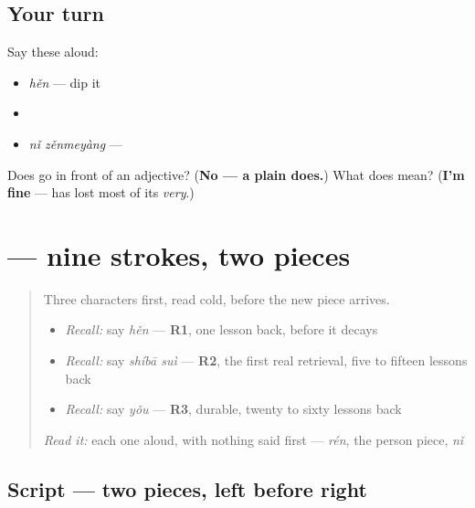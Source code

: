 \subsection*{Your turn}
Say these aloud:

\begin{itemize}
\raggedright
  \item \emph{hěn} — dip it
  \item {}
  \item \emph{nǐ zěnmeyàng} — 
\end{itemize}

\begin{tcolorbox}[breakable,colback=teal!4,colframe=teal!35!black,title={Before you move on}]
Does  go in front of an adjective? (\textbf{No — a plain  does.}) What does  mean? (\textbf{I'm fine} —  has lost most of its \emph{very}.)
\end{tcolorbox}
\section[\texorpdfstring{\zh{很} (hěn)}{很 (hěn)}]{ — nine strokes, two pieces}

\label{lesson:ZH-W30-hen}



\begin{quote}
Three characters first, read cold, before the new piece arrives.

\begin{itemize}
\raggedright
  \item \emph{Recall:} say \emph{hěn} — \textbf{R1}, one lesson back, before it decays
  \item \emph{Recall:} say \emph{shíbā suì} — \textbf{R2}, the first real retrieval, five to fifteen lessons back
  \item \emph{Recall:} say \emph{yǒu} — \textbf{R3}, durable, twenty to sixty lessons back
\end{itemize}

\begin{quote}
  
\end{quote}

\emph{Read it:} each one aloud, with nothing said first — \emph{rén}, the person piece, \emph{nǐ}
\end{quote}

\subsection*{Script — two pieces, left before right}

